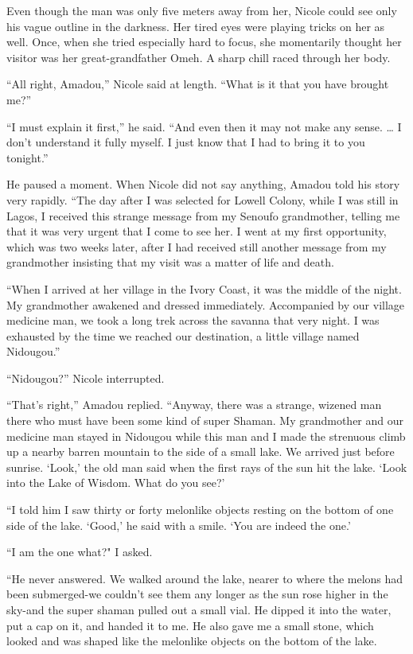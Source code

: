 \documentclass[]{article}
\begin{document}
{{Even though the man was only five meters away from her, Nicole could see only his vague outline in the darkness.  Her tired eyes were playing tricks on her as well.  Once, when she tried especially hard to focus, she momentarily thought her visitor was her great-grandfather Omeh.  A sharp chill raced through her body.

“All right, Amadou,” Nicole said at length.  “What is it that you have brought me?”

“I must explain it first,” he said.  “And even then it may not make any sense.  … I don’t understand it fully myself.  I just know that I had to bring it to you tonight.”

He paused a moment.  When Nicole did not say anything, Amadou told his story very rapidly.  “The day after I was selected for Lowell Colony, while I was still in Lagos, I received this strange message from my Senoufo grandmother, telling me that it was very urgent that I come to see her.  I went at my first opportunity, which was two weeks later, after I had received still another message from my grandmother insisting that my visit was a matter of life and death.

“When I arrived at her village in the Ivory Coast, it was the middle of the night.  My grandmother awakened and dressed immediately.  Accompanied by our village medicine man, we took a long trek across the savanna that very night.  I was exhausted by the time we reached our destination, a little village named Nidougou.”

“Nidougou?” Nicole interrupted.

“That’s right,” Amadou replied.  “Anyway, there was a strange, wizened man there who must have been some kind of super Shaman.  My grandmother and our medicine man stayed in Nidougou while this man and I made the strenuous climb up a nearby barren mountain to the side of a small lake.  We arrived just before sunrise.  ‘Look,’ the old man said when the first rays of the sun hit the lake.  ‘Look into the Lake of Wisdom.  What do you see?’

“I told him I saw thirty or forty melonlike objects resting on the bottom of one side of the lake.  ‘Good,’ he said with a smile.  ‘You are indeed the one.’

“I am the one what?" I asked.

“He never answered.  We walked around the lake, nearer to where the melons had been submerged-we couldn’t see them any longer as the sun rose higher in the sky-and the super shaman pulled out a small vial.  He dipped it into the water, put a cap on it, and handed it to me.  He also gave me a small stone, which looked and was shaped like the melonlike objects on the bottom of the lake.

}}
\end{document}
